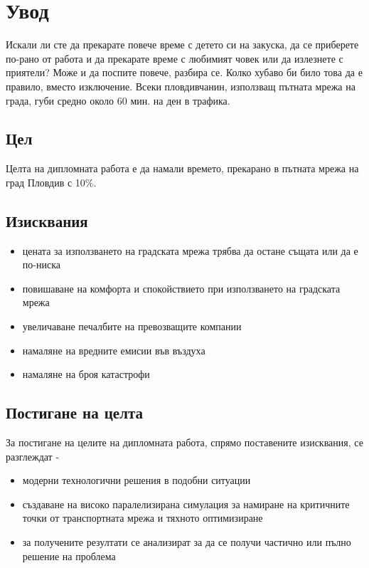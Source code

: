 \chapter{Увод}

Искали ли сте да прекарате повече време с детето си на закуска, да се приберете по-рано от работа и да прекарате време с любимият човек или да излезнете с приятели? Може и да поспите повече, разбира се. Колко хубаво би било това да е правило, вместо изключение.
Всеки пловдивчанин, използващ пътната мрежа на града, губи средно около 60 мин. на ден в трафика. 

\section{Цел}

Целта на дипломната работа е да намали времето, прекарано в пътната мрежа на град Пловдив с 10\%. 

\section{Изисквания}

\begin{itemize}
\item цената за използването на градската мрежа трябва да остане същата или да е по-ниска
\item повишаване на комфорта и спокойствието при използването на градската мрежа
\item увеличаване печалбите на превозващите компании
\item намаляне на вредните емисии във въздуха
\item намаляне на броя катастрофи
\end{itemize}

\section{Постигане на целта}

За постигане на целите на дипломната работа, спрямо поставените изисквания, се разглеждат - 

\begin{itemize}
\item модерни технологични решения в подобни ситуации
\item създаване на високо паралелизирана симулация за намиране на критичните точки от транспортната мрежа и тяхното оптимизиране
\item за получените резултати се анализират за да се получи частично или пълно решение на проблема
\end{itemize}

